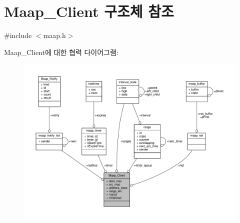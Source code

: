 \hypertarget{struct_maap___client}{}\section{Maap\+\_\+\+Client 구조체 참조}
\label{struct_maap___client}


{\ttfamily \#include $<$maap.\+h$>$}



Maap\+\_\+\+Client에 대한 협력 다이어그램\+:
\nopagebreak
\begin{figure}[H]
\begin{center}
\leavevmode
\includegraphics[width=350pt]{struct_maap___client__coll__graph}
\end{center}
\end{figure}

